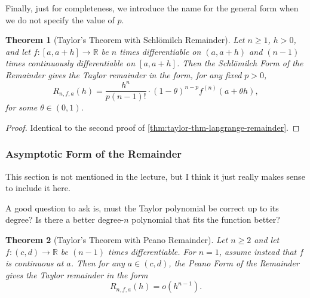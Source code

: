 \documentclass[11pt]{article}
\numberwithin{equation}{section}
\newtheorem{theorem}{Theorem}[section]
\theoremstyle{definition}
\theoremstyle{remark}
\newcommand{\pqty}[1]{\left(#1\right)}
\newcommand{\ccintv}[2]{[#1,#2]}
\newcommand{\oointv}[2]{(#1,#2)}
\newcommand{\functiondomain}[3]{#1:#2\to #3}
\newcommand{\RR}{\mathbb R}
\newcommand{\littleO}{o}
\begin{document}
Finally, just for completeness, we introduce the name for the general form when we do not specify the value of \(p\).

\begin{theorem}[Taylor's Theorem with Schl\"{o}milch Remainder]\label{analysis-unit-0136}
    \label{thm:taylor-thm-schlomilch-remainder}%
    Let \(n\ge1\), \(h>0\), and let \(\functiondomain{f}{\ccintv{a}{a + h}}{\RR}\) be \(n\) times differentiable on \(\oointv{a}{a + h}\) and \(\pqty{n - 1}\) times continuously differentiable on \(\ccintv{a}{a + h}\). Then the \emph{Schl\"{o}milch Form of the Remainder} gives the Taylor remainder in the form, for any fixed \(p > 0\),
    \[
        R_{n, f, a} \pqty{h} = \frac{h^{n}}{p \pqty{n - 1}!} \cdot \pqty{1 - \theta}^{n - p} f^{\pqty{n}} \pqty{a + \theta h},
    \]
    for some \(\theta \in \oointv{0}{1}\).
\end{theorem}

\begin{proof}
    Identical to the second proof of \autoref{thm:taylor-thm-langrange-remainder}.
\end{proof}

\subsubsection{Asymptotic Form of the Remainder}

This section is not mentioned in the lecture, but I think it just really makes sense to include it here.

A good question to ask is, must the Taylor polynomial be correct up to its degree? Is there a better degree-\(n\) polynomial that fits the function better?

\begin{theorem}[Taylor's Theorem with Peano Remainder]\label{analysis-unit-0137}
    \label{thm:taylor-thm-peano-remainder}%
    Let \(n\ge2\) and let \(\functiondomain{f}{\oointv{c}{d}}{\RR}\) be \(\pqty{n - 1}\) times differentiable. For \(n=1\), assume instead that \(f\) is continuous at \(a\). Then for any \(a \in \oointv{c}{d}\), the \emph{Peano Form of the Remainder} gives the Taylor remainder in the form
    \[
        R_{n, f, a} \pqty{h} = \littleO\pqty{h^{n - 1}}.
    \]
\end{theorem}
\end{document}
